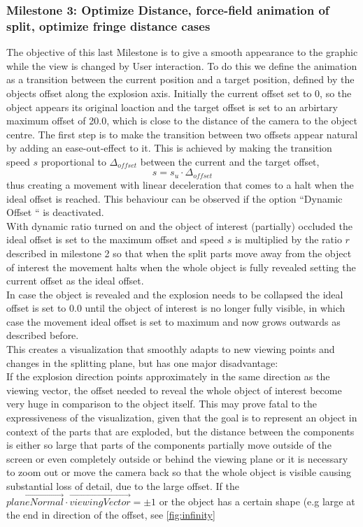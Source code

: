 \subsubsection{Milestone 3: Optimize Distance, force-field animation of split, optimize fringe distance cases} 
The objective of this last Milestone is to give a smooth appearance to the graphic while the view is changed by User interaction. To do this we define the animation as a transition between the current position and a target position, defined by the objects offset along the explosion axis. Initially the current offset set to 0, so the object appears its original loaction and the target offset is set to an arbirtary maximum offset of 20.0, which is close to the distance of the camera to the object centre. The first step is to make the transition between two offsets appear natural by adding an ease-out-effect to it. This is achieved by making the transition speed $s$ proportional to $\Delta_{offset}$ between the current and the target offset, 
\begin{equation}
	s=s_u \cdot \Delta_{offset}
\end{equation}
thus creating a movement with linear deceleration that comes to a halt when the ideal offset is reached. This behaviour can be observed if the option ``Dynamic Offset `` is deactivated.\\
With dynamic ratio turned on and the object of interest (partially) occluded the ideal offset is set to the maximum offset and speed $s$ is multiplied by the ratio $r$ described in milestone 2 so that when the split parts move away from the object of interest the movement halts when the whole object is fully revealed setting the current offset as the ideal offset.\\
In case the object is revealed and the explosion needs to be collapsed the ideal offset is set to 0.0 until the object of interest is no longer fully visible, in which case the movement ideal offset is set to maximum and now grows outwards as described before.\\
This creates a visualization that smoothly adapts to new viewing points and changes in the splitting plane, but has one major disadvantage:\\
If the explosion direction points approximately in the same direction as the viewing vector,  the offset needed to reveal the whole object of interest become very huge in comparison to the object itself. This may prove fatal to the expressiveness of the visualization, given that the goal is to represent an object in context of the parts that are exploded, but the distance between the components is either so large that parts of the components partially move outside of the screen or even completely outside or behind the viewing plane or it is necessary to zoom out or move the camera back so that the whole object is visible causing substantial loss of detail, due to the large offset. If the $\vec{planeNormal} \cdot \vec{viewingVector} = \pm1$ or the object has a certain shape (e.g large at the end in direction of the offset, see  \ref{fig:infinity}
